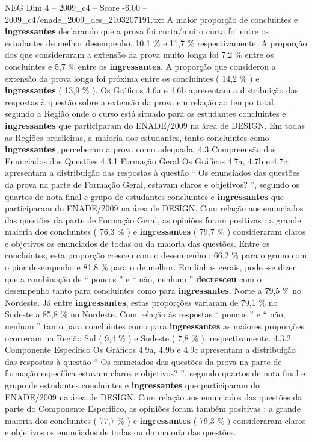 \begin{textsample}{NEG Dim 4 – 2009\_c4 – Score -6.00 – 2009\_c4/enade\_2009\_des\_2103207191.txt}
A maior proporção de concluintes e \textbf{ingressantes} declarando que a prova foi curta/muito curta foi entre os estudantes de melhor desempenho, 10,1 \% e 11,7 \% respectivamente.
A proporção dos que consideraram a extensão da prova muito longa foi 7,2 \% entre os concluintes e 5,7 \% entre os \textbf{ingressantes}.
A proporção que considerou a extensão da prova longa foi próxima entre os concluintes ( 14,2 \% ) e \textbf{ingressantes} ( 13,9 \% ).
Os Gráficos 4.6a e 4.6b apresentam a distribuição das respostas à questão sobre a extensão da prova em relação ao tempo total, segundo a Região onde o curso está situado para os estudantes concluintes e \textbf{ingressantes} que participaram do ENADE/2009 na área de DESIGN.
Em todas as Regiões brasileiras, a maioria dos estudantes, tanto concluintes como \textbf{ingressantes}, perceberam a prova como adequada. 4.3 Compreensão dos Enunciados das Questões 4.3.1 Formação Geral Os Gráficos 4.7a, 4.7b e 4.7c apresentam a distribuição das respostas à questão “ Os enunciados das questões da prova na parte de Formação Geral, estavam claros e objetivos? ”, segundo os quartos de nota final e grupo de estudantes concluintes e \textbf{ingressantes} que participaram do ENADE/2009 na área de DESIGN.
Com relação aos enunciados das questões da parte de Formação Geral, as opiniões foram positivas : a grande maioria dos concluintes ( 76,3 \% ) e \textbf{ingressantes} ( 79,7 \% ) consideraram claros e objetivos os enunciados de todas ou da maioria das questões.
Entre os concluintes, esta proporção cresceu com o desempenho : 66,2 \% para o grupo com o pior desempenho e 81,8 \% para o de melhor.
Em linhas gerais, pode -se dizer que a combinação de “ poucos ” e “ não, nenhum ” \textbf{decresceu} com o desempenho tanto para concluintes como para \textbf{ingressantes}.
Norte a 79,5 \% no Nordeste.
Já entre \textbf{ingressantes}, estas proporções variaram de 79,1 \% no Sudeste a 85,8 \% no Nordeste.
Com relação às respostas “ poucos ” e “ não, nenhum ” tanto para concluintes como para \textbf{ingressantes} as maiores proporções ocorreram na Região Sul ( 9,4 \% ) e Sudeste ( 7,8 \% ), respectivamente. 4.3.2 Componente Específico Os Gráficos 4.9a, 4.9b e 4.9c apresentam a distribuição das respostas à questão “ Os enunciados das questões da prova na parte de formação específica estavam claros e objetivos? ”, segundo quartos de nota final e grupo de estudantes concluintes e \textbf{ingressantes} que participaram do ENADE/2009 na área de DESIGN.
Com relação aos enunciados das questões da parte do Componente Específico, as opiniões foram também positivas : a grande maioria dos concluintes ( 77,7 \% ) e \textbf{ingressantes} ( 79,3 \% ) consideraram claros e objetivos os enunciados de todas ou da maioria das questões.

\end{textsample}
